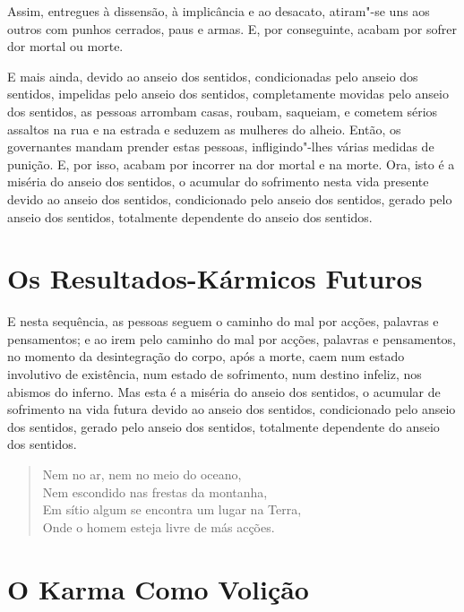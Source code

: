 Assim, entregues à dissensão, à implicância e ao desacato, atiram"-se uns aos
outros com punhos cerrados, paus e armas. E, por conseguinte, acabam por sofrer
dor mortal ou morte.

E mais ainda, devido ao anseio dos sentidos, condicionadas pelo anseio dos
sentidos, impelidas pelo anseio dos sentidos, completamente movidas pelo anseio
dos sentidos, as pessoas arrombam casas, roubam, saqueiam, e cometem sérios
assaltos na rua e na estrada e seduzem as mulheres do alheio. Então, os
governantes mandam prender estas pessoas, infligindo"-lhes várias medidas de
punição. E, por isso, acabam por incorrer na dor mortal e na morte. Ora, isto é
a miséria do anseio dos sentidos, o acumular do sofrimento nesta vida presente
devido ao anseio dos sentidos, condicionado pelo anseio dos sentidos, gerado
pelo anseio dos sentidos, totalmente dependente do anseio dos sentidos.


\section{Os Resultados-Kármicos Futuros}

E nesta sequência, as pessoas seguem o caminho do mal por acções, palavras e
pensamentos; e ao irem pelo caminho do mal por acções, palavras e pensamentos,
no momento da desintegração do corpo, após a morte, caem num estado involutivo
de existência, num estado de sofrimento, num destino infeliz, nos abismos do
inferno. Mas esta é a miséria do anseio dos sentidos, o acumular de sofrimento
na vida futura devido ao anseio dos sentidos, condicionado pelo anseio dos
sentidos, gerado pelo anseio dos sentidos, totalmente dependente do anseio dos
sentidos.


\begin{verse}
  Nem no ar, nem no meio do oceano,\\
  Nem escondido nas frestas da montanha,\\
  Em sítio algum se encontra um lugar na Terra,\\
  Onde o homem esteja livre de más acções.

\end{verse}

\section{O Karma Como Volição}

